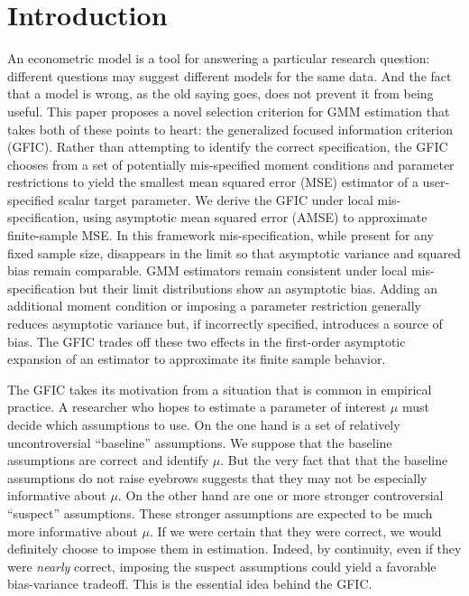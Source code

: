 \section{Introduction}


An econometric model is a tool for answering a particular research question: different questions may suggest different models for the same data. 
And the fact that a model is wrong, as the old saying goes, does not prevent it from being useful. 
This paper proposes a novel selection criterion for GMM estimation that takes both of these points to heart: the generalized focused information criterion (GFIC). 
Rather than attempting to identify the correct specification, the GFIC chooses from a set of potentially mis-specified moment conditions and parameter restrictions to yield the smallest mean squared error (MSE) estimator of a user-specified scalar target parameter. 
We derive the GFIC under local mis-specification, using asymptotic mean squared error (AMSE) to approximate finite-sample MSE. 
In this framework mis-specification, while present for any fixed sample size, disappears in the limit so that asymptotic variance and squared bias remain comparable. 
GMM estimators remain consistent under local mis-specification but their limit distributions show an asymptotic bias. 
Adding an additional moment condition or imposing a parameter restriction generally reduces asymptotic variance but, if incorrectly specified, introduces a source of bias.
The GFIC trades off these two effects in the first-order asymptotic expansion of an estimator to approximate its finite sample behavior.

The GFIC takes its motivation from a situation that is common in empirical practice.
A researcher who hopes to estimate a parameter of interest $\mu$ must decide which assumptions to use.
On the one hand is a set of relatively uncontroversial ``baseline'' assumptions.
We suppose that the baseline assumptions are correct and identify $\mu$.
But the very fact that that the baseline assumptions do not raise eyebrows suggests that they may not be especially informative about $\mu$. 
On the other hand are one or more stronger controversial ``suspect'' assumptions.
These stronger assumptions are expected to be much more informative about $\mu$.
If we were certain that they were correct, we would definitely choose to impose them in estimation.
Indeed, by continuity, even if they were \emph{nearly} correct, imposing the suspect assumptions could yield a favorable bias-variance tradeoff.
This is the essential idea behind the GFIC.

